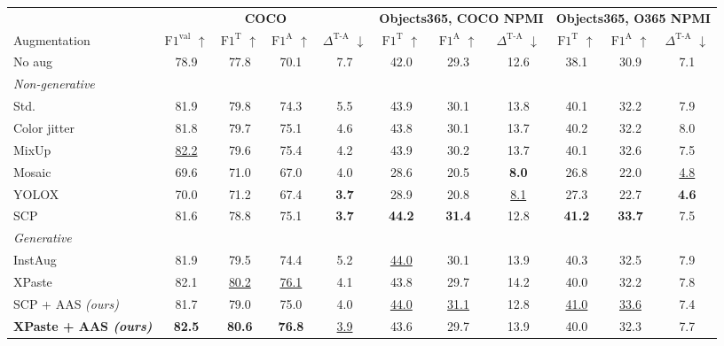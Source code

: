 \begin{tabular}{l cccc ccc ccc}
\toprule
& \multicolumn{4}{c}{\textbf{COCO}} & \multicolumn{3}{c}{\textbf{Objects365, COCO NPMI}} & \multicolumn{3}{c}{\textbf{Objects365, O365 NPMI}} \\
\cmidrule(lr){2-5} \cmidrule(lr){6-8} \cmidrule(lr){9-11}
Augmentation & $\text{F1}^{\text{val}}$ $\uparrow$ & $\text{F1}^{\text{T}}$ $\uparrow$ & $\text{F1}^{\text{A}}$ $\uparrow$ & $\Delta^{\text{T-A}}$ $\downarrow$ & $\text{F1}^{\text{T}}$ $\uparrow$ & $\text{F1}^{\text{A}}$ $\uparrow$ & $\Delta^{\text{T-A}}$ $\downarrow$ & $\text{F1}^{\text{T}}$ $\uparrow$ & $\text{F1}^{\text{A}}$ $\uparrow$ & $\Delta^{\text{T-A}}$ $\downarrow$ \\
\midrule
No aug & 78.9 & 77.8 & 70.1 & 7.7 & 42.0 & 29.3 & 12.6 & 38.1 & 30.9 & 7.1 \\
\midrule
\multicolumn{11}{l}{\emph{Non-generative}} \\
Std. & 81.9 & 79.8 & 74.3 & 5.5 & 43.9 & 30.1 & 13.8 & 40.1 & 32.2 & 7.9 \\
Color jitter & 81.8 & 79.7 & 75.1 & 4.6 & 43.8 & 30.1 & 13.7 & 40.2 & 32.2 & 8.0 \\
MixUp & \underline{82.2} & 79.6 & 75.4 & 4.2 & 43.9 & 30.2 & 13.7 & 40.1 & 32.6 & 7.5 \\
Mosaic & 69.6 & 71.0 & 67.0 & 4.0 & 28.6 & 20.5 & \textbf{8.0} & 26.8 & 22.0 & \underline{4.8} \\
YOLOX & 70.0 & 71.2 & 67.4 & \textbf{3.7} & 28.9 & 20.8 & \underline{8.1} & 27.3 & 22.7 & \textbf{4.6} \\
SCP & 81.6 & 78.8 & 75.1 & \textbf{3.7} & \textbf{44.2} & \textbf{31.4} & 12.8 & \textbf{41.2} & \textbf{33.7} & 7.5 \\
\midrule
\multicolumn{11}{l}{\emph{Generative}} \\
InstAug & 81.9 & 79.5 & 74.4 & 5.2 & \underline{44.0} & 30.1 & 13.9 & 40.3 & 32.5 & 7.9 \\
XPaste & 82.1 & \underline{80.2} & \underline{76.1} & 4.1 & 43.8 & 29.7 & 14.2 & 40.0 & 32.2 & 7.8 \\
\midrule
\rowcolor{oursrow} SCP + AAS \emph{(ours)} & 81.7 & 79.0 & 75.0 & 4.0 & \underline{44.0} & \underline{31.1} & 12.8 & \underline{41.0} & \underline{33.6} & 7.4 \\
\rowcolor{oursrow} \textbf{XPaste + AAS \emph{(ours)}} & \textbf{82.5} & \textbf{80.6} & \textbf{76.8} & \underline{3.9} & 43.6 & 29.7 & 13.9 & 40.0 & 32.3 & 7.7 \\
\bottomrule
\end{tabular}
